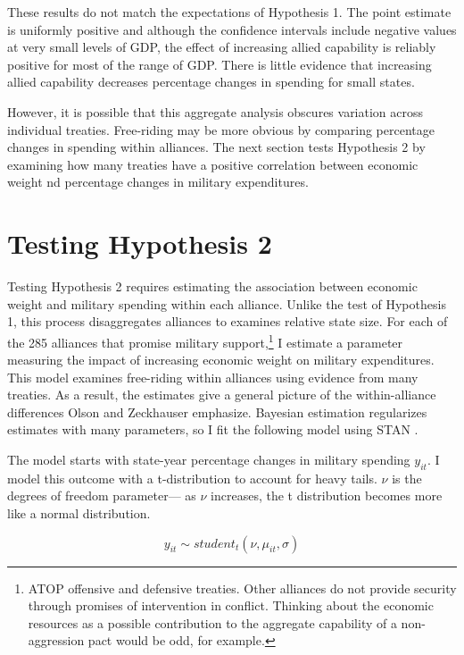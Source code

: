\documentclass[12pt]{article}
\begin{document}
These results do not match the expectations of Hypothesis 1. 
The point estimate is uniformly positive and although the confidence intervals include negative values at very small levels of GDP, the effect of increasing allied capability is reliably positive for most of the range of GDP. 
There is little evidence that increasing allied capability decreases percentage changes in spending for small states. 


However, it is possible that this aggregate analysis obscures variation across individual treaties. 
Free-riding may be more obvious by comparing percentage changes in spending within alliances. 
The next section tests Hypothesis 2 by examining how many treaties have a positive correlation between economic weight nd percentage changes in military expenditures. 


\section{Testing Hypothesis 2}


Testing Hypothesis 2 requires estimating the association between economic weight and military spending within each alliance.
Unlike the test of Hypothesis 1, this process disaggregates alliances to examines relative state size. 
For each of the 285 alliances that promise military support,\footnote{ATOP offensive and defensive treaties. Other alliances do not provide security through promises of intervention in conflict. Thinking about the economic resources as a possible contribution to the aggregate capability of a non-aggression pact would be odd, for example.} I estimate a parameter measuring the impact of increasing economic weight on military expenditures. 
This model examines free-riding within alliances using evidence from many treaties. 
As a result, the estimates give a general picture of the within-alliance differences Olson and Zeckhauser emphasize.  
Bayesian estimation regularizes estimates with many parameters, so I fit the following model using STAN \citep{Carpenteretal2016}.


The model starts with state-year percentage changes in military spending $y_{it}$.
I model this outcome with a t-distribution to account for heavy tails.
$\nu$ is the degrees of freedom parameter--- as $\nu$ increases, the t distribution becomes more like a normal distribution. 


\begin{equation}
y_{it} \sim student_t(\nu, \mu_{it}, \sigma) 
\end{equation}
\end{document}
